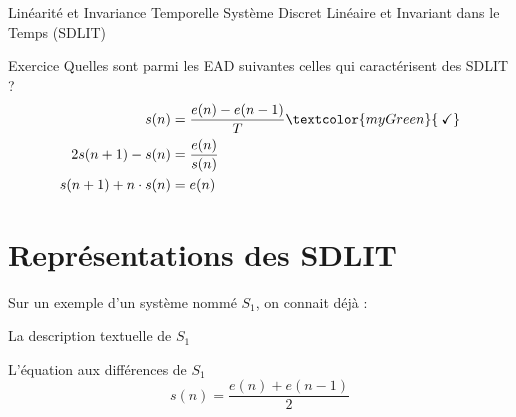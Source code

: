 \documentclass[a4paper,11pt]{beamer}
\newcounter{exampleBlockCounter}
\begin{document}
\begin{frame}
\begin{alertblock}{Linéarité et Invariance Temporelle}
\center
Système Discret Linéaire et Invariant dans le Temps (SDLIT) 
\end{alertblock}
\begin{exampleblock}{Exercice }
\justifying
Quelles sont parmi les EAD suivantes celles qui caractérisent des SDLIT ?
\setcounter{equation}{0}
\begin{align}
  s(n) &= \frac{e(n)-e(n-1)}{T}\textcolor{myGreen}{\:\checkmark}\\
  2s(n+1) - s(n) &= \frac{e(n)}{s(n)}\\
  s(n+1) + n\cdot s(n) &= e(n)
\end{align}
\end{exampleblock}
\end{frame}

\section{Représentations des SDLIT}
\begin{frame}
\centering Sur un exemple d'un système nommé $S_1$, on connait déjà :
\vspace{1cm}
\begin{block}{La description textuelle de $S_1$}
\end{block}
\pause
\vspace{1cm}
\begin{block}{L'équation aux différences de $S_1$}
\[
s(n) = \frac{e(n) + e(n-1)}{2}
\]
\end{block}
\end{frame}
\end{document}
